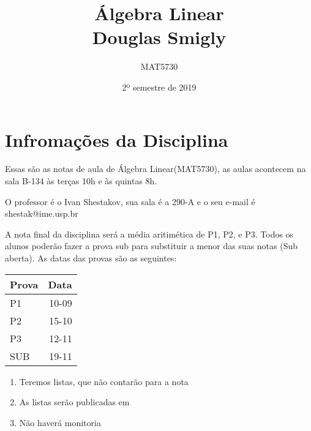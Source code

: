\documentclass[11pt,twoside,a4paper]{book}
\title{Álgebra Linear \\  Douglas Smigly}
\author{MAT5730}
\date{2º semestre de 2019}
\begin{document}
\maketitle
\newpage
\tableofcontents
\newpage
\newpage
\chapter*{Infromações da Disciplina}
\label{sec:intro}
\label{new-question}

Essas são as notas de aula de Álgebra Linear(MAT5730), as aulas acontecem na sala B-134 às terças 10h e às quintas 8h.



O professor é o Ivan Shestakov, sua sala é a 290-A e o seu e-mail é shestak@ime.usp.br

\nocite{*}



A nota final da disciplina será a média aritimética de P1, P2, e P3. Todos os
alunos poderão fazer a prova sub para substituir a menor das suas notas (Sub
aberta). As datas das provas são as seguintes:

\begin{table}[h!]
  \begin{center}
    
    \label{tab:table1}
    \begin{tabular}{l|r} %
      \textbf{Prova} & \textbf{Data}\\
      \hline
      P1 & 10-09\\
      P2 & 15-10\\
      P3 & 12-11\\
      SUB & 19-11
    \end{tabular}
  \end{center}
\end{table}

\begin{enumerate}[label=(\roman*)]
\item Teremos listas, que não contarão para a nota
\item As listas serão publicadas em 
\item Não haverá monitoria
\end{enumerate}
\newpage 
\end{document}
